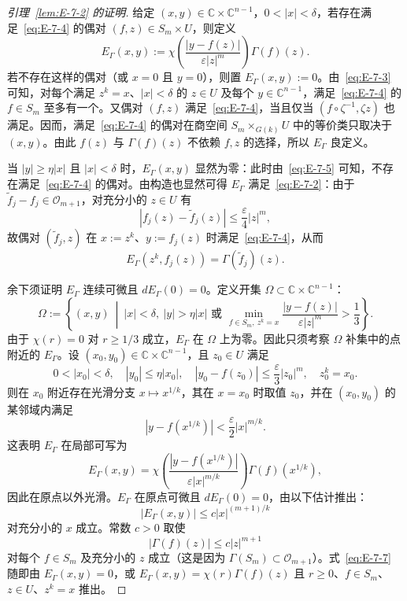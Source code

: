 \begin{proof}[引理~\ref{lem:E-7-2} 的证明]
给定 $(x,y)\in\mathbb C\times\mathbb C^{n-1}$，$0<|x|<\delta$，若存在满足~\eqref{eq:E-7-4} 的偶对 $(f,z)\in S_m\times U$，则定义
\[
  E_\Gamma(x,y):=
  \chi\!\left(\frac{|y-f(z)|}{\varepsilon|z|^m}\right)
  \Gamma(f)(z).
\]
若不存在这样的偶对（或 $x=0$ 且 $y=0$），则置 $E_\Gamma(x,y):=0$。由~\eqref{eq:E-7-3} 可知，对每个满足 $z^k=x$、$|x|<\delta$ 的 $z\in U$ 及每个 $y\in\mathbb C^{n-1}$，满足~\eqref{eq:E-7-4} 的 $f\in S_m$ 至多有一个。又偶对 $(f,z)$ 满足~\eqref{eq:E-7-4}，当且仅当 $(f\circ\zeta^{-1},\zeta z)$ 也满足。因而，满足~\eqref{eq:E-7-4} 的偶对在商空间 $S_m\times_{G(k)}U$ 中的等价类只取决于 $(x,y)$。由此 $f(z)$ 与 $\Gamma(f)(z)$ 不依赖 $f,z$ 的选择，所以 $E_\Gamma$ 良定义。

当 $|y|\ge\eta|x|$ 且 $|x|<\delta$ 时，$E_\Gamma(x,y)$ 显然为零：此时由~\eqref{eq:E-7-5} 可知，不存在满足~\eqref{eq:E-7-4} 的偶对。由构造也显然可得 $E_\Gamma$ 满足~\eqref{eq:E-7-2}：由于 $\widetilde f_j-f_j\in\mathcal O_{m+1}$，对充分小的 $z\in U$ 有
\[
  |f_j(z)-\widetilde f_j(z)|\le\frac\varepsilon4|z|^m,
\]
故偶对 $(\widetilde f_j,z)$ 在 $x:=z^k$、$y:=f_j(z)$ 时满足~\eqref{eq:E-7-4}，从而
\[
  E_\Gamma(z^k,f_j(z))=\Gamma(\widetilde f_j)(z).
\]

余下须证明 $E_\Gamma$ 连续可微且 $dE_\Gamma(0)=0$。定义开集 $\Omega\subset\mathbb C\times\mathbb C^{n-1}$：
\[
  \Omega:=\left\{(x,y)\ \middle|\ |x|<\delta,\ |y|>\eta|x|
  \text{ 或 }\min_{f\in S_m,\ z^k=x}
    \frac{|y-f(z)|}{\varepsilon|z|^m}>\frac13\right\}.
\]
由于 $\chi(r)=0$ 对 $r\ge1/3$ 成立，$E_\Gamma$ 在 $\Omega$ 上为零。因此只须考察 $\Omega$ 补集中的点附近的 $E_\Gamma$。设 $(x_0,y_0)\in\mathbb C\times\mathbb C^{n-1}$，且 $z_0\in U$ 满足
\[
  0<|x_0|<\delta,\quad |y_0|\le\eta|x_0|,
  \quad |y_0-f(z_0)|\le\frac\varepsilon3|z_0|^m,
  \quad z_0^k=x_0.
\]
则在 $x_0$ 附近存在光滑分支 $x\mapsto x^{1/k}$，其在 $x=x_0$ 时取值 $z_0$，并在 $(x_0,y_0)$ 的某邻域内满足
\[
  |y-f(x^{1/k})|<\frac\varepsilon2|x|^{m/k}.
\]
这表明 $E_\Gamma$ 在局部可写为
\begin{equation}\label{eq:E-7-6}
  E_\Gamma(x,y)=
  \chi\!\left(\frac{|y-f(x^{1/k})|}{\varepsilon|x|^{m/k}}\right)
  \Gamma(f)(x^{1/k}),
\end{equation}
因此在原点以外光滑。$E_\Gamma$ 在原点可微且 $dE_\Gamma(0)=0$，由以下估计推出：
\begin{equation}\label{eq:E-7-7}
  |E_\Gamma(x,y)|\le c|x|^{(m+1)/k}
\end{equation}
对充分小的 $x$ 成立。常数 $c>0$ 取使
\[
  |\Gamma(f)(z)|\le c|z|^{m+1}
\]
对每个 $f\in S_m$ 及充分小的 $z$ 成立（这是因为 $\Gamma(S_m)\subset\mathcal O_{m+1}$）。式~\eqref{eq:E-7-7} 随即由 $E_\Gamma(x,y)=0$，或 $E_\Gamma(x,y)=\chi(r)\Gamma(f)(z)$ 且 $r\ge0$、$f\in S_m$、$z\in U$、$z^k=x$ 推出。


\end{proof}

